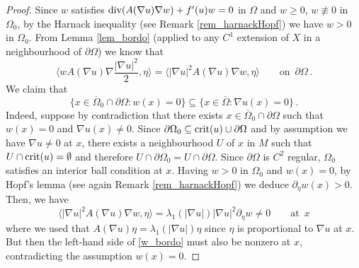 \documentclass[10 pt,a4paper]{article}
\theoremstyle{definition}
\begin{document}
\begin{proof}
	Since $w$ satisfies $\mathrm{div}(A(\nabla u)\nabla w) + f'(u) w = 0$ in $\Omega$ and $w\geq 0$, $w\not\equiv 0$ in $\Omega_0$, by the Harnack inequality (see Remark \ref{rem_harnackHopf}) we have $w>0$ in $\Omega_0$. From Lemma \ref{lem_bordo} (applied to any $C^1$ extension of $X$ in a neighbourhood of $\partial\Omega$) we know that
	\begin{equation} \label{w_bordo}
		\langle w A(\nabla u) \nabla \frac{|\nabla u|^2}{2},\eta\rangle = \langle |\nabla u|^2  A(\nabla u)\nabla w, \eta\rangle \qquad \text{on } \, \partial\Omega \, .
	\end{equation}
	We claim that
	\begin{equation} \label{w_bordo2}
		\{ x \in \overline{\Omega}_0 \cap \partial\Omega : w(x) = 0 \} \subseteq \{ x \in \overline{\Omega} : \nabla u(x) = 0 \} \, .
	\end{equation}
	Indeed, suppose by contradiction that there exists $x\in\overline{\Omega}_0 \cap \partial\Omega$ such that $w(x) = 0$ and $\nabla u(x)\neq 0$. Since $\partial\Omega_0 \subseteq {\rm crit}(u) \cup \partial\Omega$ and by assumption we have $\nabla u\neq 0$ at $x$, there exists a neighbourhood $U$ of $x$ in $M$ such that $U\cap{\rm crit}(u) = \emptyset$ and therefore $U\cap\partial\Omega_0 = U\cap\partial\Omega$. Since $\partial\Omega$ is $C^2$ regular, $\Omega_0$ satisfies an interior ball condition at $x$. Having $w>0$ in $\Omega_0$ and $w(x)=0$, by Hopf's lemma (see again Remark \ref{rem_harnackHopf}) we deduce $\partial_\eta w(x) > 0$. Then, we have
	\[
	\langle|\nabla u|^2 A(\nabla u)\nabla w,\eta\rangle = \lambda_1(|\nabla u|) |\nabla u|^2 \partial_\eta w \neq 0 \qquad \text{at } \, x
	\]
	where we used that $A(\nabla u)\eta = \lambda_1(|\nabla u|)\eta$ since $\eta$ is proportional to $\nabla u$ at $x$. But then the left-hand side of \eqref{w_bordo} must also be nonzero at $x$, contradicting the assumption $w(x) = 0$.
	

\end{proof}
\end{document}
